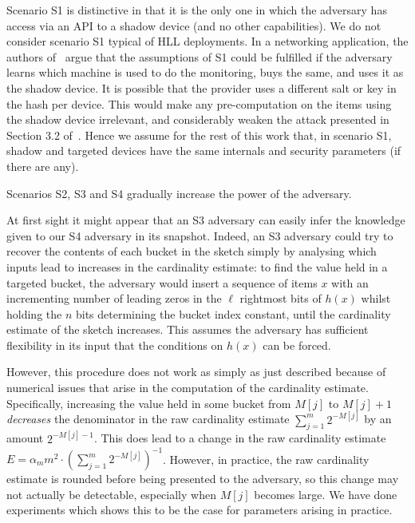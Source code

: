 \documentclass{article}
\begin{document}
Scenario S1 is distinctive in that it is the only one in which the adversary has access via an API to a shadow device (and no other capabilities). We do not consider scenario S1 typical of HLL deployments. In a networking application, the authors of~\cite{hllvuln} argue that the assumptions of S1 could be fulfilled if the adversary learns which machine is used to do the monitoring, buys the same, and uses it as the shadow device. It is possible that the provider uses a different salt or key in the hash per device. This would make any pre-computation on the items using the shadow device irrelevant, and considerably weaken the attack presented in Section 3.2 of~\cite{hllvuln}. Hence we assume for the rest of this work that, in scenario S1, shadow and targeted devices have the same internals and security parameters (if there are any). 

Scenarios S2, S3 and S4 gradually increase the power of the adversary. 

At first sight it might appear that an S3 adversary can easily infer the knowledge given to our S4 adversary in its snapshot. Indeed, an S3 adversary could try to recover the contents of each bucket in the sketch simply by analysing which inputs lead to increases in the cardinality estimate: to find the value held in a targeted bucket, the adversary would insert a sequence of items $x$ with an incrementing number of leading zeros in the $\ell$ rightmost bits of $h(x)$ whilst holding the $n$ bits determining the bucket index constant, until the cardinality estimate of the sketch increases. This assumes the adversary has sufficient flexibility in its input that the conditions on $h(x)$ can be forced. 

However, this procedure does not work as simply as just described because of numerical issues that arise in the computation of the cardinality estimate. Specifically, increasing the value held in some bucket from $M[j]$ to $M[j]+1$ \emph{decreases} the denominator in the raw cardinality estimate $\sum_{j=1}^m2^{-M[j]}$ by an amount $2^{-M[j]-1}$. This does lead to a change in the raw cardinality estimate $E = \alpha_mm^2\cdot(\sum_{j=1}^m2^{-M[j]})^{-1}$. However, in practice, the raw cardinality estimate is rounded before being presented to the adversary, so this change may not actually be detectable, especially when $M[j]$ becomes large. We have done experiments which shows this to be the case for parameters arising in practice. 
\end{document}
